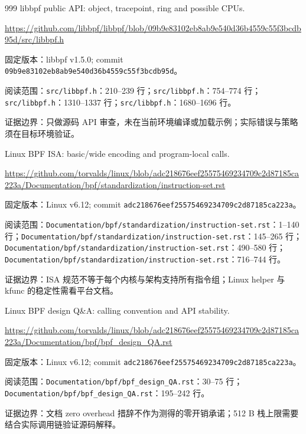 \documentclass[UTF8,fontset=fandol,openany,11pt]{ctexbook}
\begin{document}
\begin{thebibliography}{999}
 libbpf public API: object, tracepoint, ring and possible CPUs.\par
\url{https://github.com/libbpf/libbpf/blob/09b9e83102eb8ab9e540d36b4559c55f3bcdb95d/src/libbpf.h}\par
{\small\raggedright 固定版本：libbpf v1.5.0; commit \texttt{09b9e831\allowbreak{}02eb8ab9\allowbreak{}e540d36b\allowbreak{}4559c55f\allowbreak{}3bcdb95d}。\par
阅读范围：\nolinkurl{src/libbpf.h}：210–239 行；\nolinkurl{src/libbpf.h}：754–774 行；\nolinkurl{src/libbpf.h}：1310–1337 行；\nolinkurl{src/libbpf.h}：1680–1696 行。\par
证据边界：只做源码 API 审查，未在当前环境编译或加载示例；实际错误与策略须在目标环境验证。
}

 Linux BPF ISA: basic/wide encoding and program-local calls.\par
\url{https://github.com/torvalds/linux/blob/adc218676eef25575469234709c2d87185ca223a/Documentation/bpf/standardization/instruction-set.rst}\par
{\small\raggedright 固定版本：Linux v6.12; commit \texttt{adc21867\allowbreak{}6eef2557\allowbreak{}54692347\allowbreak{}09c2d871\allowbreak{}85ca223a}。\par
阅读范围：\nolinkurl{Documentation/bpf/standardization/instruction-set.rst}：1–140 行；\nolinkurl{Documentation/bpf/standardization/instruction-set.rst}：145–265 行；\nolinkurl{Documentation/bpf/standardization/instruction-set.rst}：490–580 行；\nolinkurl{Documentation/bpf/standardization/instruction-set.rst}：716–744 行。\par
证据边界：ISA 规范不等于每个内核与架构支持所有指令组；Linux helper 与 kfunc 的稳定性需看平台文档。
}

 Linux BPF design Q\&A: calling convention and API stability.\par
\url{https://github.com/torvalds/linux/blob/adc218676eef25575469234709c2d87185ca223a/Documentation/bpf/bpf_design_QA.rst}\par
{\small\raggedright 固定版本：Linux v6.12; commit \texttt{adc21867\allowbreak{}6eef2557\allowbreak{}54692347\allowbreak{}09c2d871\allowbreak{}85ca223a}。\par
阅读范围：\nolinkurl{Documentation/bpf/bpf_design_QA.rst}：30–75 行；\nolinkurl{Documentation/bpf/bpf_design_QA.rst}：195–242 行。\par
证据边界：文档 zero overhead 措辞不作为测得的零开销承诺；512 B 栈上限需要结合实际调用链验证源码解释。
}


\end{thebibliography}
\end{document}
